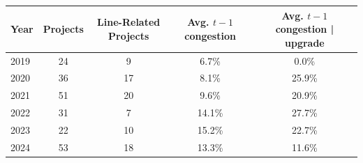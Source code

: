 \begin{table}[!htbp]
\centering
\small
\setlength{\tabcolsep}{6pt}
\renewcommand{\arraystretch}{1.00}
\begin{tabular}{@{}lcccc@{}}
\toprule
Year & Projects & Line-Related Projects & Avg. $t-1$ congestion & Avg. $t-1$ congestion | upgrade \\
\midrule
2019 & 24 & 9 & 6.7\% & 0.0\% \\
2020 & 36 & 17 & 8.1\% & 25.9\% \\
2021 & 51 & 20 & 9.6\% & 20.9\% \\
2022 & 31 & 7 & 14.1\% & 27.7\% \\
2023 & 22 & 10 & 15.2\% & 22.7\% \\
2024 & 53 & 18 & 13.3\% & 11.6\% \\
\bottomrule
\end{tabular}
\end{table}
